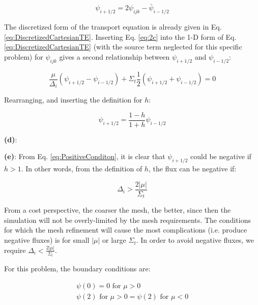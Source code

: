 \documentclass[10pt]{article}
\newcommand*\circled[1]{\tikz[baseline=(char.base)]{
            \node[shape=circle,draw,inner sep=2pt] (char) {#1};}}
\begin{document}
\begin{equation}
\label{eq:2c}
\psi_{i+1/2}=2\psi_{ijk}-\bar{\psi}_{i-1/2}
\end{equation}

The discretized form of the transport equation is already given in Eq. \eqref{eq:DiscretizedCartesianTE}. Inserting Eq. \eqref{eq:2c} into the 1-D form of Eq. \eqref{eq:DiscretizedCartesianTE} (with the source term neglected for this specific problem) for \(\psi_{ijk}\) gives a second relationship between \(\psi_{i+1/2}\) and \(\psi_{i-1/2}\):

\begin{equation}
\frac{\mu}{\Delta_i}(\psi_{i+1/2}-\psi_{i-1/2})+\Sigma_{t}\frac{1}{2}\left(\psi_{i+1/2}+\psi_{i-1/2}\right)=0
\end{equation}

Rearranging, and inserting the definition for \(h\):

\begin{equation}
\label{eq:PositiveConditon}
\psi_{i+1/2}=\frac{1-h}{1+h}\psi_{i-1/2}
\end{equation}

\textbf{(d)}: 

\textbf{(e)}: From Eq. \eqref{eq:PositiveConditon}, it is clear that \(\psi_{i+1/2}\) could be negative if \(h>1\). In other words, from the definition of \(h\), the flux can be negative if:

\begin{equation}
\Delta_i>\frac{2|\mu|}{\Sigma_t}
\end{equation}

From a cost perspective, the coarser the mesh, the better, since then the simulation will not be overly-limited by the mesh requirements. The conditions for which the mesh refinement will cause the most complications (i.e. produce negative fluxes) is for small \(|\mu|\) or large \(\Sigma_t\). In order to avoid negative fluxes, we require \(\Delta_i<\frac{2|\mu|}{\Sigma_t}\).\newline 

\circled{3} For this problem, the boundary conditions are:

\begin{equation}
\begin{aligned}
\psi(0)=0 \text{ for } \mu>0\\
\psi(2) \text{ for } \mu>0 = \psi(2) \text{ for } \mu<0\\
\end{aligned}
\end{equation}
\end{document}
